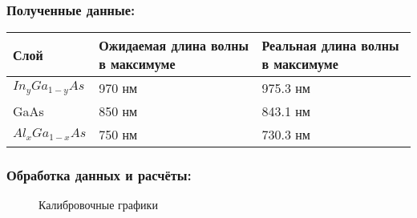 \documentclass[../FinalReport.tex]{subfiles}
\begin{document}
\subsubsection{Полученные данные:}
\begin{flushleft}
\begin{tabular}{p{} | p{} | p{}}
Слой&Ожидаемая длина волны в максимуме&Реальная длина волны в максимуме\\
\hline
\vspace{5 pt}$In_{y}Ga_{1-y}As$&\vspace{5 pt}970 нм&\vspace{5 pt} 975.3 нм\\
GaAs&850 нм&843.1 нм\\
$Al_{x}Ga_{1-x}As$&750 нм&730.3 нм\\
\end{tabular}
\end{flushleft}

\subsubsection{Обработка данных и расчёты:}

\begin{figure}[h!]
\caption{Калибровочные графики}
\end{figure}
\end{document}
